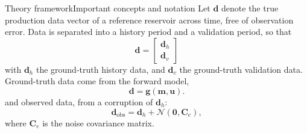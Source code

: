 
\begin{frame}{Theory framework}{Important concepts and notation}
    Let $\mathbf{d}$ denote the true production data vector of a reference reservoir across time,
    free of observation error.
    Data is separated into a history period and a validation period,
    so that 
    \begin{equation}
        \mathbf{d} = 
        \begin{bmatrix}
            \mathbf{d}_h \\
            \mathbf{d}_v
        \end{bmatrix}
    \end{equation}
    with $\mathbf{d}_h$ the ground-truth history data, and $\mathbf{d}_v$ the ground-truth validation data.
    \vfill
    Ground-truth data come from the forward model,
    \begin{equation}
        \mathbf{d} = \mathbf{g}(\mathbf{m}, \mathbf{u}).
    \end{equation}
    and observed data, from a corruption of $\mathbf{d}_h$:
    \begin{equation}
        \mathbf{d}_\text{obs} = \mathbf{d}_h + \mathcal{N}(\mathbf{0}, \mathbf{C}_e),
    \end{equation}
    where $\mathbf{C}_e$ is the noise covariance matrix.
\end{frame}

